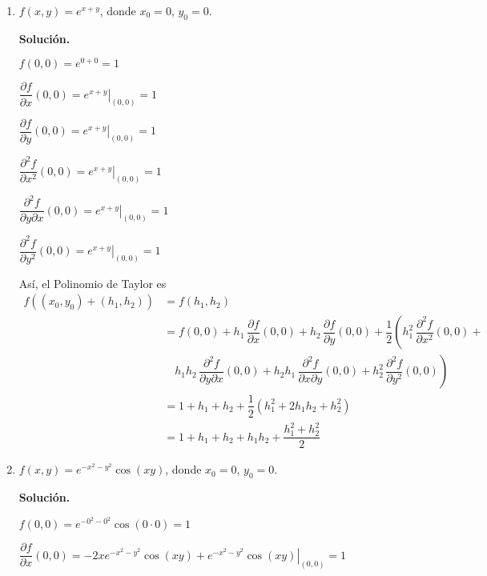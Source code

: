 \documentclass[fleqn, 12pt]{article}
\newcommand{\derivadaparcial}[2]{\dfrac{\partial {#1}}{\partial {#2}}}
\newcommand{\derivadaparcialn}[3]{\dfrac{\partial^{#3} {#1}}{\partial {#2}^{#3}}}
\newcommand{\derivadaparcialnd}[3]{\dfrac{\partial^{2} {#1}}{\partial {#3} \partial {#2}}}
\begin{document}
\begin{enumerate}
        \item $ f(x,y) = e^{x + y} $, donde $ x_0 = 0 $, $ y_0 = 0 $.
        
        \textbf{Solución.}

        $ f(0,0) = e^{0 + 0} = 1 $

        $ \derivadaparcial{f}{x} (0,0) = \left. e^{x + y} \right|_{(0,0)} = 1 $

        $ \derivadaparcial{f}{y} (0,0) = \left. e^{x + y} \right|_{(0,0)} = 1 $

        $ \derivadaparcialn{f}{x}{2} (0,0) = \left. e^{x + y} \right|_{(0,0)} = 1 $

        $ \derivadaparcialnd{f}{x}{y} (0,0) = \left. e^{x + y} \right|_{(0,0)} = 1 $

        $ \derivadaparcialn{f}{y}{2} (0,0) = \left. e^{x + y} \right|_{(0,0)} = 1 $

        Así, el Polinomio de Taylor es
        \begin{align*}
            f((x_0, y_0) + (h_1, h_2)) &= f(h_1, h_2) \\
            &= f(0,0) + h_1 \, \derivadaparcial{f}{x} (0,0) + h_2 \, \derivadaparcial{f}{y} (0,0) + \dfrac{1}{2} \left( h_1^2 \, \derivadaparcialn{f}{x}{2} (0,0) \right. + \\
            & \quad \left. h_1 h_2 \, \derivadaparcialnd{f}{x}{y} (0,0) + h_2 h_1 \, \derivadaparcialnd{f}{y}{x} (0,0) + h_2^2 \, \derivadaparcialn{f}{y}{2} (0,0) \right) \\
            &= 1 + h_1 + h_2 + \dfrac{1}{2} \left( h_1^2 + 2 h_1 h_2 + h_2^2 \right) \\
            &= 1 + h_1 + h_2 + h_1 h_2 + \dfrac{h_1^2 + h_2^2}{2}
        \end{align*}

        \item $ f(x,y) = e^{-x^2 - y^2} \cos (xy) $, donde $ x_0 = 0 $, $ y_0 = 0 $.
        
        \textbf{Solución.}
        
        $ f(0,0) = e^{-0^2 - 0^2} \cos (0 \cdot 0) = 1 $

        $ \derivadaparcial{f}{x} (0,0) = \left. -2x e^{-x^2 - y^2} \cos (xy) + e^{-x^2 - y^2} \cos (xy) \right|_{(0,0)} = 1 $


\end{enumerate}
\end{document}

